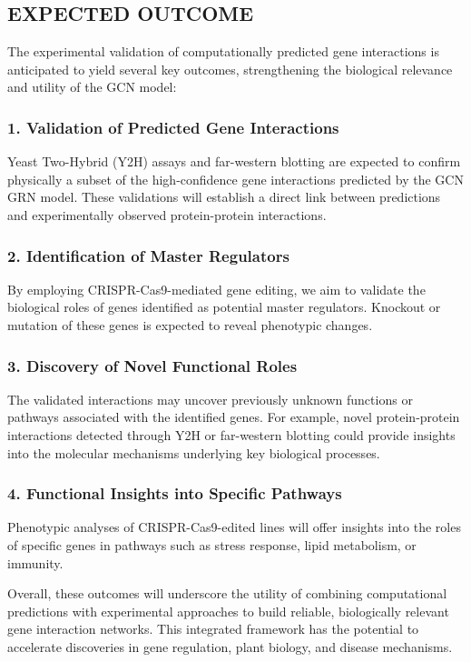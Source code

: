 \documentclass{article}
\begin{document}
\subsection{EXPECTED OUTCOME}

The experimental validation of computationally predicted gene interactions is anticipated to yield several key outcomes, strengthening the biological relevance and utility of the GCN model:

\subsubsection*{1. Validation of Predicted Gene Interactions}
Yeast Two-Hybrid (Y2H) assays and far-western blotting are expected to confirm physically a subset of the high-confidence gene interactions predicted by the GCN GRN model. These validations will establish a direct link between predictions and experimentally observed protein-protein interactions.

\subsubsection*{2. Identification of Master Regulators}
By employing CRISPR-Cas9-mediated gene editing, we aim to validate the biological roles of genes identified as potential master regulators. Knockout or mutation of these genes is expected to reveal phenotypic changes.

\subsubsection*{3. Discovery of Novel Functional Roles}
The validated interactions may uncover previously unknown functions or pathways associated with the identified genes. For example, novel protein-protein interactions detected through Y2H or far-western blotting could provide insights into the molecular mechanisms underlying key biological processes.

\subsubsection*{4. Functional Insights into Specific Pathways}
Phenotypic analyses of CRISPR-Cas9-edited lines will offer insights into the roles of specific genes in pathways such as stress response, lipid metabolism, or immunity.

\bigskip

Overall, these outcomes will underscore the utility of combining computational predictions with experimental approaches to build reliable, biologically relevant gene interaction networks. This integrated framework has the potential to accelerate discoveries in gene regulation, plant biology, and disease mechanisms.
\end{document}
